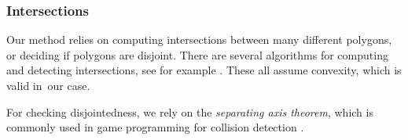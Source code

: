 
\subsubsection{Intersections} \label{sec:intersections}

Our method relies on computing intersections between many different polygons, or deciding if polygons are
disjoint. There are several algorithms for computing and detecting intersections, see for example
\cite{Toussaint85, Rourke82, Chazelle80}.  These all assume convexity, which is valid in\
our case.

For checking disjointedness, we rely on the {\em separating axis theorem}, which is commonly used in game
programming for collision detection \cite{Gottschalk96}.


